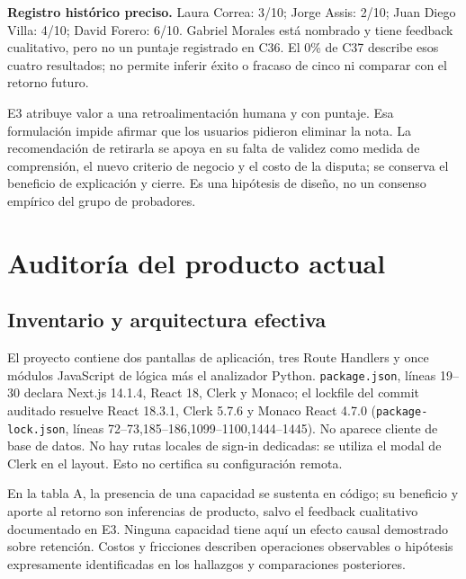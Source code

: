 \documentclass[11pt,a4paper]{report}
\newcommand{\src}[2]{\nolinkurl{#1}, líneas #2}
\begin{document}
\textbf{Registro histórico preciso.} Laura Correa: 3/10; Jorge Assis: 2/10; Juan Diego Villa: 4/10; David Forero: 6/10. Gabriel Morales está nombrado y tiene feedback cualitativo, pero no un puntaje registrado en C36. El 0\% de C37 describe esos cuatro resultados; no permite inferir éxito o fracaso de cinco ni comparar con el retorno futuro.

E3 atribuye valor a una retroalimentación humana y con puntaje. Esa formulación impide afirmar que los usuarios pidieron eliminar la nota. La recomendación de retirarla se apoya en su falta de validez como medida de comprensión, el nuevo criterio de negocio y el costo de la disputa; se conserva el beneficio de explicación y cierre. Es una hipótesis de diseño, no un consenso empírico del grupo de probadores.

\chapter{Auditoría del producto actual}
\label{ch:actual}
\section{Inventario y arquitectura efectiva}
El proyecto contiene dos pantallas de aplicación, tres Route Handlers y once módulos JavaScript de lógica más el analizador Python. \src{package.json}{19--30} declara Next.js 14.1.4, React 18, Clerk y Monaco; el lockfile del commit auditado resuelve React 18.3.1, Clerk 5.7.6 y Monaco React 4.7.0 (\src{package-lock.json}{72--73,185--186,1099--1100,1444--1445}). No aparece cliente de base de datos. No hay rutas locales de sign-in dedicadas: se utiliza el modal de Clerk en el layout. Esto no certifica su configuración remota.

En la tabla A, la presencia de una capacidad se sustenta en código; su beneficio y aporte al retorno son inferencias de producto, salvo el feedback cualitativo documentado en E3. Ninguna capacidad tiene aquí un efecto causal demostrado sobre retención. Costos y fricciones describen operaciones observables o hipótesis expresamente identificadas en los hallazgos y comparaciones posteriores.
\end{document}

